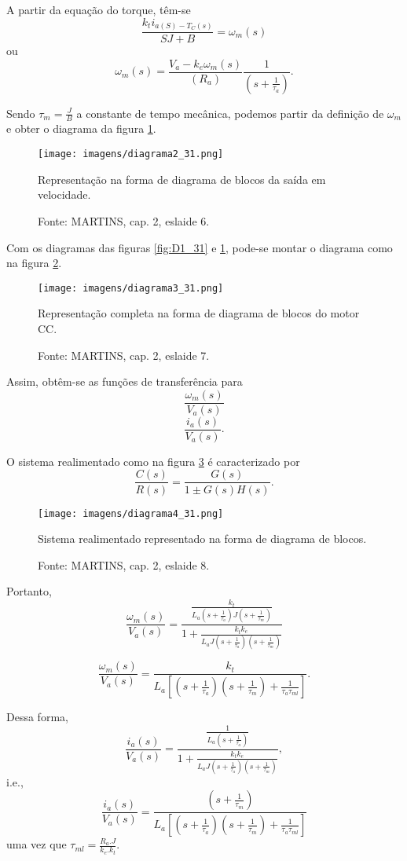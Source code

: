A partir da equação do torque, têm-se
\[\frac{k_{t}i_{a(S) - T_{C}(s)}}{SJ + B} = \omega_{m}(s)\]
ou
\[\omega_{m}(s) = \frac{V_{a} - k_{e}\omega_{m}(s)}{(R_{a})}\frac{1}{\left(s + \frac{1}{\tau_{a}}\right)}.\]

Sendo $\tau_{m} = \frac{J}{B}$ a constante de tempo mecânica, podemos partir da definição de $\omega_{m}$ e obter o diagrama da figura \ref{fig:D2_31}.

\begin{figure}[ht!]
\center
\texttt{[image: imagens/diagrama2\_31.png]}
\caption{\label{fig:D2_31} Representação na forma de diagrama de blocos da saída em velocidade.}
\caption*{Fonte: MARTINS, cap. 2, eslaide 6.}
\end{figure}

Com os diagramas das figuras \ref{fig:D1_31} e \ref{fig:D2_31}, pode-se montar o diagrama como na figura \ref{fig:D3_31}.

\begin{figure}[ht!]
\center
\texttt{[image: imagens/diagrama3\_31.png]}
\caption{\label{fig:D3_31}Representação completa na forma de diagrama de blocos do motor CC.}
\caption*{Fonte: MARTINS, cap. 2, eslaide 7.}
\end{figure}

Assim, obtêm-se as funções de transferência para
\[\frac{\omega_{m}(s)}{V_{a}(s)}\]
\[\frac{i_{a}(s)}{V_{a}(s)}.\]

O sistema realimentado como na figura \ref{fig:D4_31} é caracterizado por
\[\frac{C(s)}{R(s)} = \frac{G(s)}{1  \pm G(s)H(s)}.\]

\begin{figure}[ht!]
\center
\texttt{[image: imagens/diagrama4\_31.png]}
\caption{\label{fig:D4_31} Sistema realimentado representado na forma de diagrama de blocos.}
\caption*{Fonte: MARTINS, cap. 2, eslaide 8.}
\end{figure}

Portanto,
\[\frac{\omega_{m}(s)}{V_{a}(s)} = \frac{\frac{k_{t}}{L_{a}\left(s + \frac{1}{\tau_{a}}\right)J\left(s + \frac{1}{\tau_{m}}\right)}}{1 + \frac{k_{t}k_{e}}{L_{a}J\left(s + \frac{1}{\tau_{a}}\right)\left(s + \frac{1}{\tau_{m}}\right)}}\]

\[\frac{\omega_{m}(s)}{V_{a}(s)} =  \frac{k_{t}}{L_{a}\left[  \left(s + \frac{1}{\tau_{a}}\right)\left(s + \frac{1}{\tau_{m}}\right) + \frac{1}{\tau_{a}\tau_{ml}}\right] } .\]

Dessa forma,
\[\frac{i_{a}(s)}{V_{a}(s)} = \frac{\frac{1}{L_{a}\left(s + \frac{1}{\tau_{a}}\right)}}{1 + \frac{k_{t}k_{e}}{L_{a}J\left(s + \frac{1}{\tau_{a}}\right)\left(s + \frac{1}{\tau_{m}}\right)}},\]
i.e.,
\[\frac{i_{a}(s)}{V_{a}(s)} =  \frac{\left(s + \frac{1}{\tau_{m}}\right)}{L_{a}\left[  \left(s + \frac{1}{\tau_{a}}\right)\left(s + \frac{1}{\tau_{m}}\right) + \frac{1}{\tau_{a}\tau_{ml}}\right] } \] 
uma vez que $\tau_{ml} = \frac{R_{a}.J}{k_{e}.k_{t}}$.

